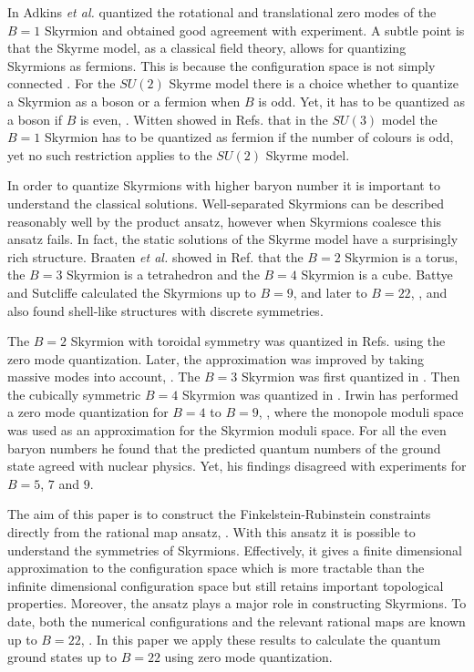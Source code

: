 \documentclass[a4paper,12pt]{article}
\begin{document}
In \cite{Adkins:1983ya, Adkins:1984hy} Adkins {\it et al.} quantized
the rotational and translational zero modes of the $B=1$ Skyrmion and
obtained good agreement with experiment. A subtle point is that the
Skyrme model, as a classical field theory, allows for quantizing
Skyrmions as fermions. This is because the configuration space is not
simply connected \cite{Finkelstein:1968hy}. For the $SU(2)$ Skyrme
model there is a choice whether to quantize a Skyrmion as a boson or a
fermion when $B$ is odd. Yet, it has to be quantized as a boson if $B$
is even, \cite{Giulini:1993gd}.  Witten showed in
Refs. \cite{Witten:1983tw, Witten:1983tx} that in the $SU(3)$ model
the $B=1$ Skyrmion has to be quantized as fermion if the number of
colours is odd, yet no such restriction applies to the $SU(2)$ Skyrme
model. 

In order to quantize Skyrmions with higher baryon number it is
important to understand the classical solutions.  Well-separated
Skyrmions can be described reasonably well by the product ansatz,
however when Skyrmions coalesce this ansatz fails. In fact, 
the static solutions of the Skyrme model have a surprisingly rich 
structure.  
Braaten {\it et al.} showed
in Ref. \cite{Braaten:1990rg} 
that the $B=2$ Skyrmion is a torus, the
$B=3$ Skyrmion is a tetrahedron and the $B=4$ Skyrmion is a
cube. Battye and Sutcliffe calculated the Skyrmions up to $B=9$,
\cite{Battye:1997qq} and later to $B=22$, \cite{Battye:2000se}, and
also found shell-like structures with discrete symmetries. 

The $B=2$ Skyrmion with toroidal symmetry was quantized in Refs.
\cite{Braaten:1988cc,Verbaarschot:1987au} using the zero mode
quantization. Later, the approximation was improved by taking massive
modes into account, \cite{Leese:1995hb}.  The $B=3$ Skyrmion was first
quantized in \cite{Carson:1991yv}. Then the cubically symmetric $B=4$
Skyrmion was quantized in \cite{Walhout:1992gr}. Irwin has performed a
zero mode quantization for $B=4$ to $B=9$, \cite{Irwin:1998bs}, where
the monopole moduli space was used as an approximation for the Skyrmion
moduli space. For all the even baryon numbers he found that the
predicted quantum numbers of the ground state agreed with nuclear
physics.  Yet, his findings disagreed with experiments for $B=5$, $7$
and $9$. 

The aim of this paper is to construct the Finkelstein-Rubinstein
constraints directly from the rational map ansatz,
\cite{Houghton:1998kg}. With this ansatz it is possible to understand
the symmetries of Skyrmions. Effectively, it gives a finite dimensional
approximation to the configuration space which is more tractable than
the infinite dimensional configuration space but still retains 
important topological properties.  Moreover, the ansatz plays a
major role in constructing Skyrmions.  To date, both the numerical
configurations and the relevant rational maps are known up to $B=22$,
\cite{Battye:2000se, Battye:2001qn}. In this paper we apply these 
results to calculate the quantum ground states up to $B = 22$ using zero 
mode quantization. 
  
\end{document}
